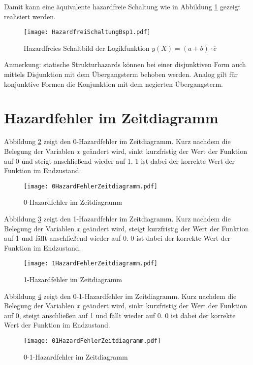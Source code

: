 Damit kann eine äquivalente hazardfreie Schaltung wie in Abbildung \ref{hazFrei} gezeigt realisiert werden.
\begin{figure}[htp]
	\centering
	\texttt{[image: HazardfreiSchaltungBsp1.pdf]}
	\caption{Hazardfreies Schaltbild der Logikfunktion $y(X) = (a + b) \cdot \overline{c}$}
	\label{hazFrei}
\end{figure}

Anmerkung: statische Strukturhazards können bei einer disjunktiven Form auch mittels Disjunktion mit dem Übergangsterm behoben werden. Analog gilt für konjunktive Formen die Konjunktion mit dem negierten Übergangsterm.

\section{Hazardfehler im Zeitdiagramm}
Abbildung \ref{0HazZeitDiag} zeigt den 0-Hazardfehler im Zeitdiagramm. Kurz nachdem die Belegung der Variablen $x$ geändert wird, sinkt kurzfristig der Wert der Funktion auf 0 und steigt anschließend wieder auf 1. 1 ist dabei der korrekte Wert der Funktion im Endzustand.
\begin{figure}[htp]
	\centering
	\texttt{[image: 0HazardFehlerZeitdiagramm.pdf]}
	\caption{0-Hazardfehler im Zeitdiagramm}
	\label{0HazZeitDiag}
\end{figure}

Abbildung \ref{1HazZeitDiag} zeigt den 1-Hazardfehler im Zeitdiagramm. Kurz nachdem die Belegung der Variablen $x$ geändert wird, steigt kurzfristig der Wert der Funktion auf 1 und fällt anschließend wieder auf 0. 0 ist dabei der korrekte Wert der Funktion im Endzustand.
\begin{figure}[htp]
	\centering
	\texttt{[image: 1HazardFehlerZeitdiagramm.pdf]}
	\caption{1-Hazardfehler im Zeitdiagramm}
	\label{1HazZeitDiag}
\end{figure}

Abbildung \ref{01HazZeitDiag} zeigt den 0-1-Hazardfehler im Zeitdiagramm. Kurz nachdem die Belegung der Variablen $x$ geändert wird, sinkt kurzfristig der Wert der Funktion auf 0, steigt anschließen auf 1 und fällt wieder auf 0. 0 ist dabei der korrekte Wert der Funktion im Endzustand.
\begin{figure}[htp]
	\centering
	\texttt{[image: 01HazardFehlerZeitdiagramm.pdf]}
	\caption{0-1-Hazardfehler im Zeitdiagramm}
	\label{01HazZeitDiag}
\end{figure}

